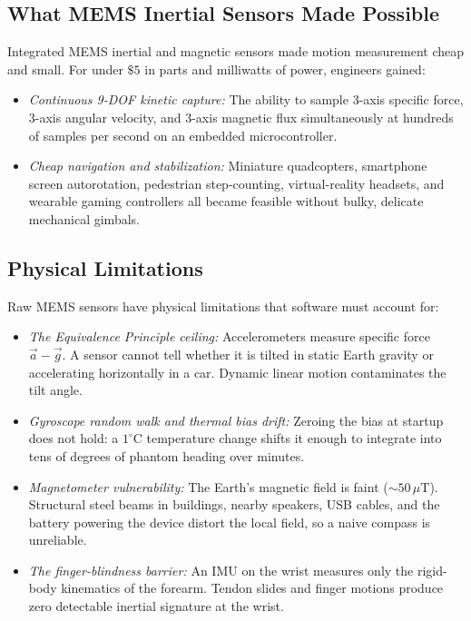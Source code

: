 \subsection{What MEMS Inertial Sensors Made Possible}
Integrated MEMS inertial and magnetic sensors made motion measurement cheap and small. For under $\$5$ in parts and milliwatts of power, engineers gained:
\begin{itemize}
  \item \emph{Continuous 9-DOF kinetic capture:} The ability to sample 3-axis specific force, 3-axis angular velocity, and 3-axis magnetic flux simultaneously at hundreds of samples per second on an embedded microcontroller.
  \item \emph{Cheap navigation and stabilization:} Miniature quadcopters, smartphone screen autorotation, pedestrian step-counting, virtual-reality headsets, and wearable gaming controllers all became feasible without bulky, delicate mechanical gimbals.
\end{itemize}

\subsection{Physical Limitations}
Raw MEMS sensors have physical limitations that software must account for:
\begin{itemize}
  \item \emph{The Equivalence Principle ceiling:} Accelerometers measure specific force $\vec{a} - \vec{g}$. A sensor cannot tell whether it is tilted in static Earth gravity or accelerating horizontally in a car. Dynamic linear motion contaminates the tilt angle.
  \item \emph{Gyroscope random walk and thermal bias drift:} Zeroing the bias at startup does not hold: a $1^\circ\text{C}$ temperature change shifts it enough to integrate into tens of degrees of phantom heading over minutes.
  \item \emph{Magnetometer vulnerability:} The Earth's magnetic field is faint ($\sim 50\,\mu\text{T}$). Structural steel beams in buildings, nearby speakers, USB cables, and the battery powering the device distort the local field, so a naive compass is unreliable.
  \item \emph{The finger-blindness barrier:} An IMU on the wrist measures only the rigid-body kinematics of the forearm. Tendon slides and finger motions produce zero detectable inertial signature at the wrist.
\end{itemize}

